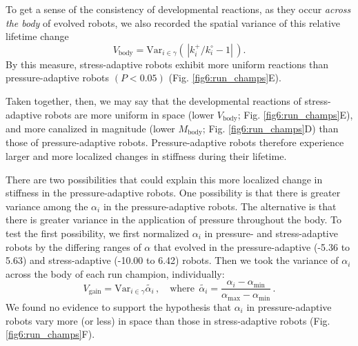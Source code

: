To get a sense of the consistency of developmental reactions, as they occur \textit{across the body} of evolved robots, we also recorded the spatial variance of this relative lifetime change 
\begin{equation}
\label{eq:sigma}
V_{\text{body}} = \text{Var}_{i \in \gamma} \left(\,\left| k_i^{+}/k_i^{\circ}-1 \right|\,\right) .
\end{equation}
By this measure, stress-adaptive robots exhibit more uniform reactions than pressure-adaptive robots $(P<0.05)$ (Fig. \ref{fig6:run_champs}E).

Taken together, then, we may say that the developmental reactions of stress-adaptive robots are more uniform in space 
(lower $V_{\text{body}}$; Fig. \ref{fig6:run_champs}E), 
and more canalized in magnitude (lower $M_{\text{body}}$; 
Fig. \ref{fig6:run_champs}D) than those of pressure-adaptive robots.
Pressure-adaptive robots therefore experience larger and more localized changes in stiffness during their lifetime.

There are two possibilities that could explain this more localized change in stiffness in the pressure-adaptive robots.
One possibility is that there is greater variance among the $\alpha_i$ in the pressure-adaptive robots.
The alternative is that there is greater variance in the application of pressure throughout the body.
To test the first possibility, we first normalized $\alpha_i$ in pressure- and stress-adaptive robots
by the differing ranges of $\alpha$ that evolved in the pressure-adaptive (-5.36 to 5.63) 
and stress-adaptive (-10.00 to 6.42) robots.
Then we took the variance of $\alpha_i$ across the body of each run champion, individually:
\begin{equation}
\label{eq:sigma-gain}
V_{\text{gain}} = \text{Var}_{i \in \gamma} \tilde{\alpha_i} \,, \quad \text{where} \;\, \tilde{\alpha_i}=\frac{\alpha_i-\alpha_{\text{min}}}{\alpha_{\text{max}}-\alpha_{\text{min}}}  \,.
\end{equation}
We found no evidence to support the hypothesis that $\alpha_i$ in pressure-adaptive robots vary more (or less) in space than those in stress-adaptive robots (Fig. \ref{fig6:run_champs}F).


